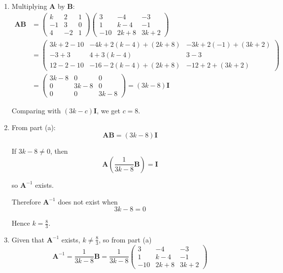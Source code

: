 \documentclass[leqno]{article}
\begin{document}
\begin{enumerate}[
  label=\textbf{\arabic*.},
  leftmargin=*,
  topsep=0pt,
  partopsep=0pt,
  parsep=0pt
]
\vspace*{10pt}

\begin{djsSolution}
\begin{enumerate}[label=\textbf{(\alph*)}]
  \item Multiplying \(\mathbf{A}\) by \(\mathbf{B}\):
\begin{align*}
\mathbf{AB}&=
\begin{pmatrix}
k & 2 & 1\\
-1 & 3 & 0\\
4 & -2 & 1
\end{pmatrix}
\begin{pmatrix}
3 & -4 & -3\\
1 & k-4 & -1\\
-10 & 2k+8 & 3k+2
\end{pmatrix}\\
&=
\begin{pmatrix}
3k+2-10 & -4k+2(k-4)+(2k+8) & -3k+2(-1)+(3k+2)\\
-3+3 & 4+3(k-4) & 3-3\\
12-2-10 & -16-2(k-4)+(2k+8) & -12+2+(3k+2)
\end{pmatrix}\\
&=
\begin{pmatrix}
3k-8 & 0 & 0\\
0 & 3k-8 & 0\\
0 & 0 & 3k-8
\end{pmatrix}
=(3k-8)\mathbf{I}
\end{align*}

Comparing with \((3k-c)\mathbf{I}\), we get \(c=8\).

  \item From part (a):
\[
\mathbf{AB}=(3k-8)\mathbf{I}
\]

If \(3k-8\neq 0\), then
\[
\mathbf{A}\left(\frac{1}{3k-8}\mathbf{B}\right)=\mathbf{I}
\]

so \(\mathbf{A}^{-1}\) exists.

Therefore \(\mathbf{A}^{-1}\) does not exist when
\[
3k-8=0
\]

Hence \(k=\frac{8}{3}\).

  \item Given that \(\mathbf{A}^{-1}\) exists, \(k\neq \frac{8}{3}\), so from part (a)
\[
\mathbf{A}^{-1}=\frac{1}{3k-8}\mathbf{B}
=\frac{1}{3k-8}
\begin{pmatrix}
3 & -4 & -3\\
1 & k-4 & -1\\
-10 & 2k+8 & 3k+2
\end{pmatrix}
\]


\end{enumerate}
\end{djsSolution}
\end{enumerate}
\end{document}
